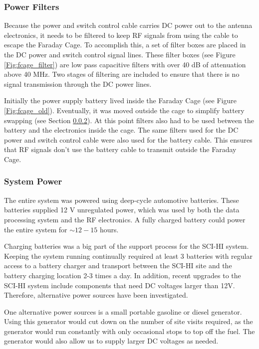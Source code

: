\subsubsection{Power Filters}

Because the power and switch control cable carries DC power out to the antenna electronics, it needs to be filtered to keep RF signals from using the cable to escape the Faraday Cage. To accomplish this, a set of filter boxes are placed in the DC power and switch control signal lines. These filter boxes (see Figure \ref{Fig:fcage_filter}) are low pass capacitive filters with over 40 dB of attenuation above 40 MHz. Two stages of filtering are included to ensure that there is no signal transmission through the DC power lines. 

Initially the power supply battery lived inside the Faraday Cage (see Figure \ref{Fig:fcage_old}). Eventually, it was moved outside the cage to simplify battery swapping (see Section \ref{Sec:sys_power}). At this point filters also had to be used between the battery and the electronics inside the cage. The same filters used for the DC power and switch control cable were also used for the battery cable. This ensures that RF signals don't use the battery cable to transmit outside the Faraday Cage.  

\subsubsection{System Power} \label{Sec:sys_power}

The entire system was powered using deep-cycle automotive batteries. These batteries supplied 12 V unregulated power, which was used by both the data processing system and the RF electronics. A fully charged battery could power the entire system for $\sim12-15$ hours. 

Charging batteries was a big part of the support process for the SCI-HI system. Keeping the system running continually required at least 3 batteries with regular access to a battery charger and transport between the SCI-HI site and the battery charging location 2-3 times a day. In addition, recent upgrades to the SCI-HI system include components that need DC voltages larger than 12V. Therefore, alternative power sources have been investigated.

One alternative power sources is a small portable gasoline or diesel generator. Using this generator would cut down on the number of site visits required, as the generator would run constantly with only occasional stops to top off the fuel. The generator would also allow us to supply larger DC voltages as needed. 

